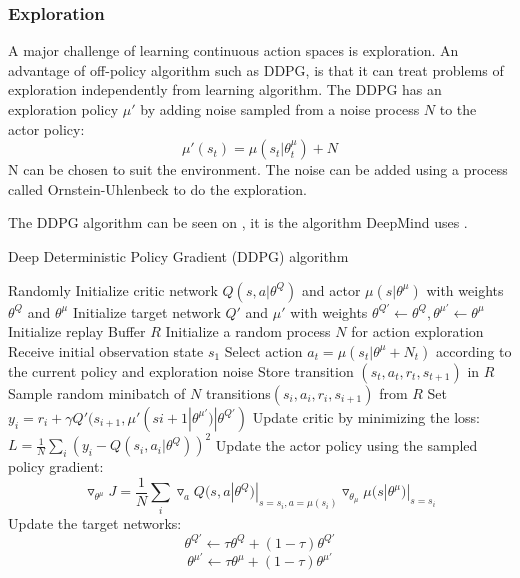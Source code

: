 \subsubsection{Exploration}
A major challenge of learning continuous action spaces is exploration. An advantage of off-policy algorithm such as DDPG, is that it can treat problems of exploration independently from learning algorithm. The DDPG has an exploration policy $\mu'$ by adding noise sampled from a noise process $N$ to the actor policy: 
\begin{equation}
\mu'(s_t) = \mu(s_t|\theta_t^\mu) + N
\end{equation} 
N can be chosen to suit the environment. The noise can be added using a process called Ornstein-Uhlenbeck to do the exploration.

The DDPG algorithm can be seen on , it is the algorithm DeepMind uses \cite{DBLP:journals/corr/LillicrapHPHETS15}.  



\begin{algorithm}[H]
	\caption{Deep Deterministic Policy Gradient (DDPG) algorithm}
	\label{algo:DDPG}
	\begin{algorithmic}[H]
		\State Randomly Initialize critic network $Q(s,a|\theta^Q)$ and actor $\mu(s|\theta^\mu)$ with weights $\theta^Q$ and $\theta^\mu$
		\State Initialize target network $Q'$ and $\mu'$ with weights $\theta^{Q'} \leftarrow \theta^{Q}, \theta^{\mu'} \leftarrow \theta^{\mu}$ 
		\State Initialize replay Buffer $R$
			\State Initialize a random process $N$ for action exploration
			\State Receive initial observation state $s_1$
				\State Select action $a_t = \mu(s_t|\theta^\mu + N_t)$ according to the current policy and exploration noise
				\State Store transition $(s_t,a_t,r_t,s_{t+1})$ in $R$
				\State Sample random minibatch of $N$ transitions$(s_i,a_i,r_i,s_{i+1})$ from $R$
				\State Set $y_i = r_i+\gamma Q'(s_{i+1},\mu'(s{i+1}|\theta^{\mu'})|\theta^{Q'})$
				\State Update critic by minimizing the loss: $L=\frac{1}{N} \sum_{i}(y_i - Q(s_i,a_i|\theta^Q))^2$
				\State Update the actor policy using the sampled policy gradient:   
		  			   \begin{equation*}
		  			   \triangledown_{\theta^\mu} J = \frac{1}{N} \sum_{i} \triangledown_{a}Q(s,a|\theta^Q)|_{s=s_i , a=\mu(s_i)} \triangledown_{\theta_\mu}\mu(s|\theta^\mu)|_{s=s_i} 
		  			   \end{equation*}
		  		\State Update the target networks:
		  			   \begin{equation*}
		  			   \theta^{Q'} \leftarrow \tau \theta^Q + (1-\tau)\theta^{Q'} 
		  			   \end{equation*}
		  			   \begin{equation*}
		  			   \theta^{\mu'} \leftarrow \tau \theta^\mu + (1-\tau)\theta^{\mu'} 
		  			   \end{equation*}
			\EndFor
		\EndFor
	\end{algorithmic}
\end{algorithm}


